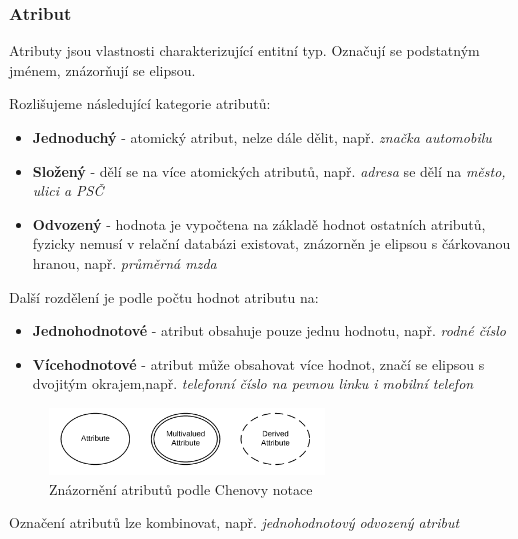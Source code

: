 \documentclass[czech,bachelor,public,dept460,male,oneside]{diploma}
\begin{document}
	\subsubsection{Atribut}
	Atributy jsou vlastnosti charakterizující entitní typ. Označují se podstatným jménem, znázorňují se elipsou.
	
	Rozlišujeme následující kategorie atributů:
	
	\begin{itemize}
		\item \textbf{Jednoduchý} - atomický atribut, nelze dále dělit, např. \textit{značka automobilu}
		\item \textbf{Složený} - dělí se na více atomických atributů, např. \textit{adresa} se dělí na \textit{město, ulici a PSČ} 
		\item \textbf{Odvozený} - hodnota je vypočtena na základě hodnot ostatních atributů, fyzicky nemusí v relační databázi existovat, znázorněn je elipsou s čárkovanou hranou, např. \textit{průměrná mzda}
	\end{itemize}

	Další rozdělení je podle počtu hodnot atributu na:
	
	\begin{itemize}
		\item \textbf{Jednohodnotové} - atribut obsahuje pouze jednu hodnotu, např. \textit{rodné číslo}
		\item \textbf{Vícehodnotové} - atribut může obsahovat více hodnot, značí se elipsou s dvojitým okrajem,např. \textit{telefonní číslo na pevnou linku i mobilní telefon}
	\end{itemize}
	
	\begin{figure}[!h]
		\centering
		\includegraphics[width=0.65\textwidth]{Figures/ChenAttr}
		\caption[Znázornění atributů podle Chenovy notace]{Znázornění atributů podle Chenovy notace \cite{erdSymbols}}
	\end{figure}
	
	Označení atributů lze kombinovat, např. \textit{jednohodnotový odvozený atribut}
	
\end{document}
